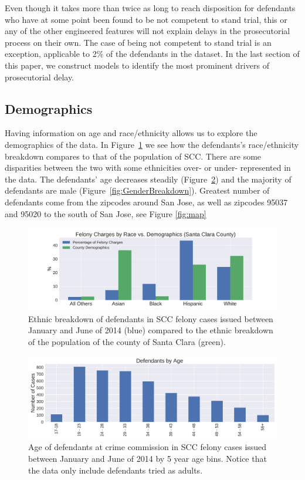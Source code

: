 \documentclass{AISB2008}
\begin{document}
Even though it takes more than twice as long to reach disposition for
defendants who have at some point been found to be not competent to
stand trial, this or any of the other engineered features will not
explain delays in the prosecutorial process on their own. The case of
being not competent to stand trial is an exception, applicable to 2\%
of the defendants in the dataset. In the last section of this paper,
we construct models to identify the most prominent drivers of
prosecutorial delay.


\subsection{Demographics}
Having information on age and race/ethnicity allows us to explore the demographics of the data. In Figure~\ref{fig:EthnicBreakdown} we see how the defendants's race/ethnicity breakdown compares to that of the population of SCC. There are some disparities between the two with some ethnicities over- or under- represented in the data. The defendants' age decreases steadily (Figure~\ref{fig:AgeBreakdown}) and the majority of defendants are male (Figure~\ref{fig:GenderBreakdown}). Greatest number of defendants come from the zipcodes around San Jose, as well as zipcodes 95037 and 95020 to the south of San Jose, see Figure \ref{fig:map}

\begin{figure}[h!]
\begin{center}
\includegraphics[width=0.70\columnwidth]{figures/chargesByRace_demographics1/chargesByRace_demographics1}
\caption{Ethnic breakdown of defendants in SCC felony cases issued between January and June of 2014 (blue) compared to the ethnic breakdown of the population of the county of Santa Clara (green).
\label{fig:EthnicBreakdown}%
}
\end{center}
\end{figure}

\begin{figure}[h!]
\begin{center}
\includegraphics[width=0.70\columnwidth]{figures/age_histo/age_histo}
\caption{Age of defendants at crime commission in SCC felony cases issued between January and June of 2014 by 5 year age bins. Notice that the data only include defendants tried as adults.
\label{fig:AgeBreakdown}%
}
\end{center}
\end{figure}
\end{document}
